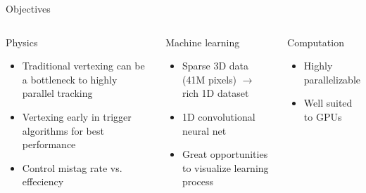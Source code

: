 \begin{frame}{Objectives}
\begin{columns}[c]
    \begin{block}{Physics}
    \begin{itemize}
        \item Traditional vertexing can be a bottleneck to highly parallel tracking
        \item Vertexing early in trigger algorithms for best performance
        \item Control mistag rate vs. effeciency
    \end{itemize}
    \end{block}
    \begin{block}{Machine learning}
    \begin{itemize}
        \item Sparse 3D data (41M pixels) $\to$ rich 1D dataset
        \item 1D convolutional neural net
        \item Great opportunities to visualize learning process
    \end{itemize}
    \end{block}

    \begin{block}{Computation}
    \begin{itemize}
        \item Highly parallelizable
        \item Well suited to GPUs
    \end{itemize}
    \end{block}
\end{columns}
\end{frame}
